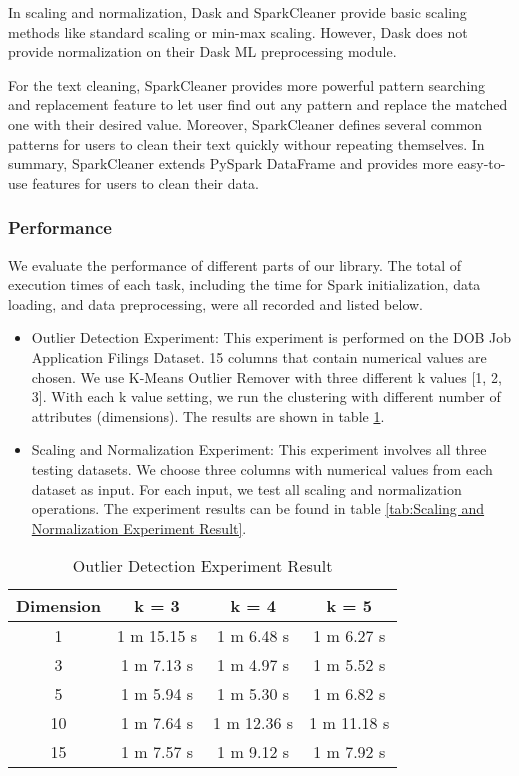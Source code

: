 \documentclass[sigconf]{acmart}
\begin{document}
In scaling and normalization, Dask and SparkCleaner provide basic scaling methods like standard scaling or min-max scaling. However, Dask does not provide normalization on their Dask ML preprocessing module.

For the text cleaning, SparkCleaner provides more powerful pattern searching and replacement feature to let user find out any pattern and replace the matched one with their desired value. Moreover, SparkCleaner defines several common patterns for users to clean their text quickly withour repeating themselves. In summary, SparkCleaner extends PySpark DataFrame and provides more easy-to-use features for users to clean their data.

\subsubsection{Performance} We evaluate the performance of different parts of our library. The total of execution times of each task, including the time for Spark initialization, data loading, and data preprocessing, were all recorded and listed below.
\begin{itemize}
	\item{Outlier Detection Experiment}: This experiment is performed on the DOB Job Application Filings Dataset. 15 columns that contain numerical values are chosen. We use K-Means Outlier Remover with three different k values [1, 2, 3]. With each k value setting, we run the clustering with different number of attributes (dimensions). The results are shown in table \ref{tab:Outlier Detection Experiment Result}.
	\item{Scaling and Normalization Experiment}: This experiment involves all three testing datasets. We choose three columns with numerical values from each dataset as input. For each input, we test all scaling and normalization operations. The experiment results can be found in table \ref{tab:Scaling and Normalization Experiment Result}.
\end{itemize}

\begin{table}
\caption{Outlier Detection Experiment Result}   
\label{tab:Outlier Detection Experiment Result}
\begin{tabular}{cccc}   
Dimension  &  k = 3  &  k = 4  & k = 5  \\  
\hline
1   & 1 m 15.15 s  & 1 m 6.48 s   & 1 m 6.27 s             \\ 
3   & 1 m 7.13 s    & 1 m 4.97 s   & 1 m 5.52 s             \\  
5   & 1 m 5.94 s    & 1 m 5.30 s   & 1 m 6.82 s             \\ 
10 & 1 m 7.64 s    & 1 m 12.36 s & 1 m 11.18 s           \\ 
15 & 1 m 7.57 s    & 1 m 9.12 s   & 1 m 7.92 s             \\ 

\end{tabular}   
\end{table}
\end{document}
